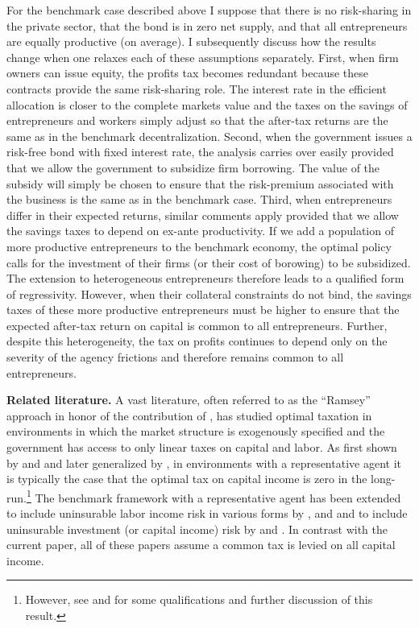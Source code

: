 \documentclass[11pt]{article}
\theoremstyle{plain}
\theoremstyle{definition} %
\begin{document}
For the benchmark case described above I suppose that there is no risk-sharing in the private sector, that the bond is in zero net supply, and that all entrepreneurs are equally productive (on average). I subsequently discuss how the results change when one relaxes each of these assumptions separately. First, when firm owners can issue equity, the profits tax becomes redundant because these contracts provide the same risk-sharing role. The interest rate in the efficient allocation is closer to the complete markets value and the taxes on the savings of entrepreneurs and workers simply adjust so that the after-tax returns are the same as in the benchmark decentralization. Second, when the government issues a risk-free bond with fixed interest rate, the analysis carries over easily provided that we allow the government 
to subsidize firm borrowing. The value of the subsidy will simply be chosen to ensure that the risk-premium associated with the business is the same as in the benchmark case. Third, when entrepreneurs differ in their expected returns, similar comments apply provided that we allow the savings taxes to depend on ex-ante productivity. If we add a population of more productive entrepreneurs to the benchmark economy, the optimal policy calls for the investment of their firms (or their cost of borowing) to be subsidized. The extension to heterogeneous entrepreneurs therefore leads to a qualified form of regressivity. However, when their collateral constraints do not bind, the savings taxes of these more productive entrepreneurs must be higher to ensure that the expected after-tax return on capital is common to all entrepreneurs. Further, despite this heterogeneity, the tax on profits continues to depend only on the severity of the agency frictions and therefore remains common to all entrepreneurs.

\textbf{Related literature.} A vast literature, often referred to as the ``Ramsey'' approach in honor of the contribution of \cite{ramsey_contribution_1927}, has studied optimal taxation in environments in which the market structure is exogenously specified and the government has access to only linear taxes on capital and labor. As first shown by \cite{chamley_optimal_1986} and \cite{judd_redistributive_1985} and later generalized by \cite{chari_taxing_1999}, in environments with a representative agent it is typically the case that the optimal tax on capital income is zero in the long-run.\footnote{However, see \cite{straub_positive_2020} and \cite{chari_optimal_2020} for some qualifications and further discussion of this result.} The benchmark framework with a representative agent has been extended to include uninsurable labor income risk in various forms by \cite{aiyagari_optimal_1995}, \cite{conesa_taxing_2009} and \cite{dyrda_optimal_2022} and to include uninsurable investment (or capital income) risk by \cite{panousi_optimal_2012} and \cite{evans_optimal_2014}. In contrast with the current paper, all of these papers assume a common tax is levied on all capital income. 
\end{document}
